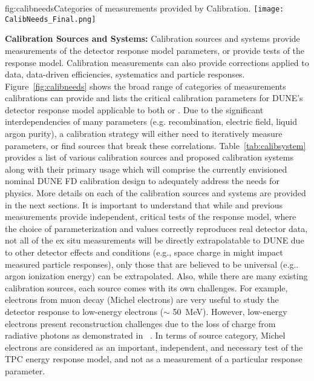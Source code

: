 \begin{dunefigure}{fig:calibneeds}{Categories of measurements provided by Calibration.}
\texttt{[image: CalibNeeds\_Final.png]}
\end{dunefigure}

\textbf{Calibration Sources and Systems:} Calibration sources and systems provide measurements of the detector response model parameters, or provide tests of the response model. 
Calibration measurements can also provide corrections applied to data, data-driven efficiencies, systematics and particle responses. Figure~\ref{fig:calibneeds} shows the broad range of categories of measurements calibrations can provide and lists the critical calibration parameters for DUNE's detector response model applicable to both  or . Due to the significant interdependencies of many parameters (e.g. recombination, electric field, liquid argon purity), a calibration strategy will either need to iteratively measure parameters, or find sources that break these correlations. Table~\ref{tab:calibsystem} provides a list of various calibration sources and proposed calibration systems along with their primary usage which will comprise the currently envisioned nominal DUNE FD calibration design to adequately address the needs for physics. More details on each of the calibration sources and systems are provided in the next sections. It is important to understand that while  and previous measurements provide independent, critical tests of the response model, where the choice of parameterization and values correctly reproduces real detector data, not all of the ex situ measurements will be directly extrapolatable to DUNE due to other detector effects and conditions (e.g., space charge in  might impact measured particle responses), only those that are believed to be universal (e.g.. argon ionization energy) can be extrapolated. Also, while there are many existing calibration sources, each source comes with its own challenges. For example, electrons from muon decay (Michel electrons) are very useful to study the detector response to low-energy electrons ($\sim$ \SI{50}{\MeV}). However, low-energy electrons present reconstruction challenges due to the loss of charge from radiative photons as demonstrated in ~\cite{uBmichel}. In terms of source category, Michel electrons are considered as an important, independent, and necessary test of the TPC energy response model, and not as a measurement of a particular response parameter.

